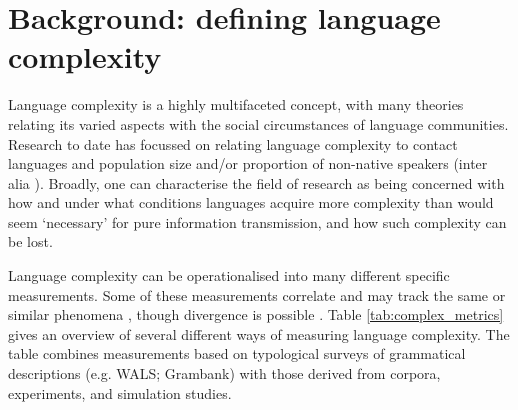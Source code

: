 \documentclass[USenglish]{article}
\begin{document}
 \section{Background: defining language complexity}\label{sec:background}

Language complexity is a highly multifaceted concept, with many theories relating its varied aspects with the social circumstances of language communities.
Research to date has focussed on relating language complexity to contact languages \citep{mcwhorter_2003} and population size and/or proportion of non-native speakers (inter alia \citet{wray2007consequences, dahl2004growth, lupyan2010language, bentz2013languages, bentz2015adaptive, raviv2019larger, koplenig2019language, shcherbakova2023societies}).
Broadly, one can characterise the field of research as being concerned with how and under what conditions languages acquire more complexity than would seem `necessary' for pure information transmission, and how such complexity can be lost. 

Language complexity can be operationalised into many different specific measurements. 
Some of these measurements correlate and may track the same or similar phenomena \citep{bentz2016comparison, bentz2023complexity, ccoltekin2023complexity}, though divergence is possible \citep{lupyan2024cautionary}.
Table \ref{tab:complex_metrics} gives an overview of several different ways of measuring language complexity. 
The table combines measurements based on typological surveys of grammatical descriptions (e.g. WALS; Grambank) with those derived from corpora, experiments, and simulation studies.
\end{document}
